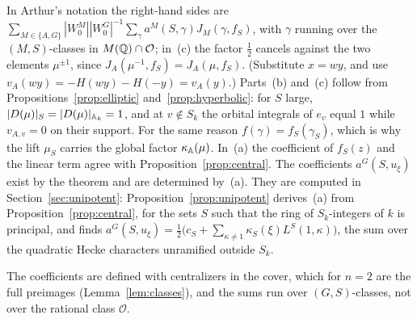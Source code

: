 In Arthur's notation the right-hand sides are
$\sum_{M\in\{A,G\}}|W^M_0||W^G_0|^{-1}\sum_{\gamma}a^M(S,\gamma)
J_M(\gamma,f_S)$, with $\gamma$ running over the $(M,S)$-classes in
$M(\mathbb{Q})\cap\mathcal O$; in~(c) the factor $\tfrac12$ cancels against the
two elements $\mu^{\pm1}$, since $J_A(\mu^{-1},f_S)=J_A(\mu,f_S)$. (Substitute
$x=wy$, and use $v_A(wy)=-H(wy)-H(-y)=v_A(y)$.) Parts~(b) and~(c) follow from
Propositions~\ref{prop:elliptic} and~\ref{prop:hyperbolic}: for $S$
large, $|D(\mu)|_S=|D(\mu)|_{\mathbb{A}_k}=1$, and at $v\notin S_k$ the orbital
integrals of $e_v$ equal $1$ while $v_{A,v}=0$ on their support. For the
same reason $f(\gamma)=f_S(\gamma_S)$, which is why the lift $\mu_S$
carries the global factor $\kappa_{\mathbb{A}}(\mu)$. In~(a) the coefficient of
$f_S(z)$ and the linear term agree with Proposition~\ref{prop:central}.
The coefficients $a^G(S,u_\xi)$ exist by the theorem and are determined
by~(a). They are computed in Section~\ref{sec:unipotent}:
Proposition~\ref{prop:unipotent} derives~(a) from
Proposition~\ref{prop:central}, for the sets $S$ such that the ring of
$S_k$-integers of $k$ is principal, and finds
$a^G(S,u_\xi)=\frac12\bigl(c_S+\sum_{\kappa\ne1}\kappa_S(\xi)L^S(1,\kappa)
\bigr)$, the sum over the quadratic Hecke characters unramified outside
$S_k$.

The coefficients are defined with centralizers in the cover, which for
$n=2$ are the full preimages (Lemma~\ref{lem:classes}), and the sums run
over $(G,S)$-classes, not over the rational class $\mathcal O$.

